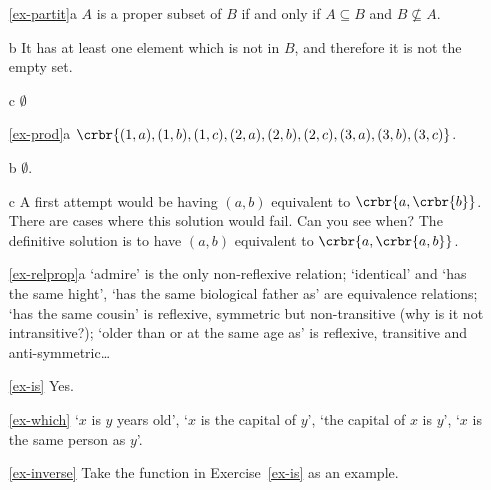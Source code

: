 \documentclass[11pt]{article}
\begin{document}
\begin{itemize}
\item[\ref{ex-partit}a] $A$ is a proper subset of $B$ if and only if
$A\subseteq B$ and $B\not\subseteq A$.
\item[b] It has at least one element which is not in $B$, and
therefore it is not the empty set.
\item[c] $\emptyset$

\item[\ref{ex-prod}a]
$\crbr{(1,a),(1,b),(1,c),(2,a),(2,b),(2,c),(3,a),(3,b),(3,c)}$.
\item[b] $\emptyset$.
\item[c] A first attempt would be having $(a,b)$ equivalent to
$\crbr{a,\crbr{b}}$. There are cases where this solution would fail. Can you see
when? The definitive solution is to have $(a,b)$ equivalent to
$\crbr{a,\crbr{a,b}}$.

\item[\ref{ex-relprop}a] `admire' is the only non-reflexive relation; `identical'
and `has the same hight', `has the same biological father as'  are equivalence
relations; `has the same cousin' is reflexive, symmetric but non-transitive (why
is it not intransitive?); `older than or at the same age as' is reflexive,
transitive and anti-symmetric\ldots

\item[\ref{ex-is}] Yes.

\item[\ref{ex-which}]
 `$x$ is $y$ years old',
`$x$ is the capital of $y$', `the capital  of $x$ is $y$', `$x$ is the same person as $y$'.


\item[\ref{ex-inverse}] Take the function in Exercise~\ref{ex-is} as an example.


\end{itemize}
\end{document}
